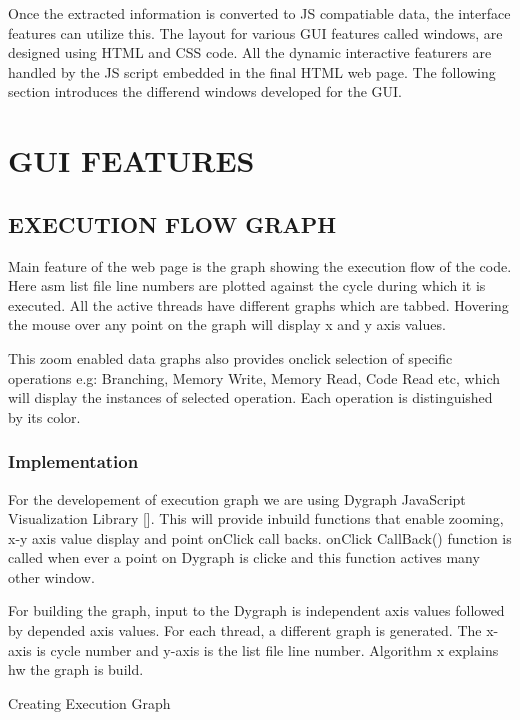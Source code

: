 Once the extracted information is converted to JS compatiable data, the interface features can utilize this. The layout for various GUI features called windows, are designed using HTML and CSS code. All the dynamic interactive featurers are handled by the JS script embedded in the final HTML web page. The following section introduces the differend windows developed for the GUI.

\section {GUI FEATURES}

\subsection {EXECUTION FLOW GRAPH}
Main feature of the web page is the graph showing the execution flow of the code. Here asm list file line numbers are plotted against the cycle during which it is executed. All the active threads have different graphs which are tabbed. Hovering the mouse over any point on the graph will display x and y axis values. 
 
This zoom enabled data graphs also provides onclick selection of specific operations e.g: Branching, Memory Write, Memory Read, Code Read etc, which will display the instances of selected operation. Each operation is distinguished by its color.   

\subsubsection {Implementation}

For the developement of execution graph we are using Dygraph JavaScript Visualization Library []. This will provide inbuild functions that enable zooming, x-y axis value display and point onClick call backs. onClick CallBack() function is called when ever a point on Dygraph is clicke and this function actives many other window.

For building the graph, input to the Dygraph is independent axis values followed by depended axis values. For each thread, a different graph is generated. The x-axis is cycle number and y-axis is the list file line number. Algorithm x explains hw the graph is build.

\IncMargin{1em}
\begin{algorithm}[H]
\DontPrintSemicolon
{} 
\KwFn{}
\BlankLine
{}
\caption{Creating Execution Graph}
\end{algorithm}\DecMargin{1em}

